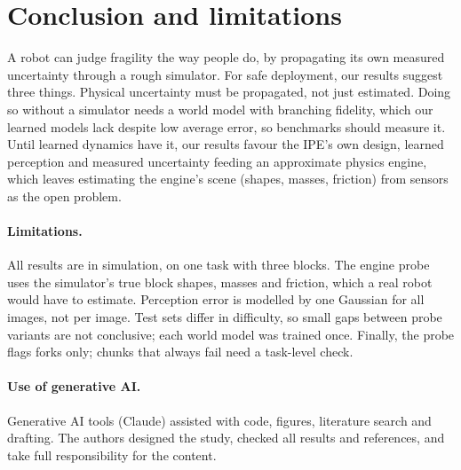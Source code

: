 \documentclass{article}
\begin{document}
\section{Conclusion and limitations}
A robot can judge fragility the way people do, by propagating its own measured uncertainty through a rough
simulator. For safe deployment, our results suggest three things. Physical uncertainty must be
propagated, not just estimated. Doing so without a simulator needs a world model with branching
fidelity, which our learned models lack despite low average error, so benchmarks should measure it. Until learned dynamics have it, our results favour the IPE's own
design, learned perception and measured uncertainty feeding an approximate physics engine, which leaves
estimating the engine's scene (shapes, masses, friction) from sensors as the open problem.
\paragraph{Limitations.} All results are in simulation, on one task with three blocks. The engine probe uses
the simulator's true block shapes, masses and friction, which a real robot would have to estimate. Perception error is modelled by one Gaussian for all images, not per image. Test sets differ in
difficulty, so small gaps between probe variants are not conclusive; each world model was trained once.
Finally, the probe flags forks only; chunks that always fail need a task-level check.

\paragraph{Use of generative AI.} Generative AI tools (Claude) assisted with code, figures, literature
search and drafting. The authors designed the study, checked all results and references, and take full
responsibility for the content.


\end{document}
